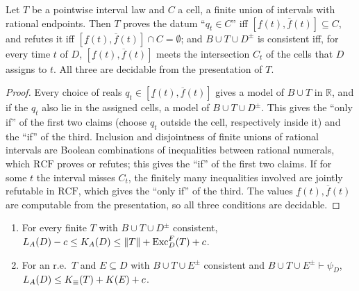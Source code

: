 \begin{lemma}[Decidability]\label{lem:laws:decidable}
Let $T$ be a pointwise interval law and $C$ a cell, a finite union of intervals with rational endpoints. Then $T$ proves the datum ``$q_t\in C$'' iff $[\underline f(t),\overline f(t)]\subseteq C$, and refutes it iff $[\underline f(t),\overline f(t)]\cap C=\emptyset$; and $B\cup T\cup D^\pm$ is consistent iff, for every time $t$ of $D$, $[\underline f(t),\overline f(t)]$ meets the intersection $C_t$ of the cells that $D$ assigns to $t$. All three are decidable from the presentation of $T$.
\end{lemma}

\begin{proof}
Every choice of reals $q_t\in[\underline f(t),\overline f(t)]$ gives a model of $B\cup T$ in $\mathbb R$, and if the $q_t$ also lie in the assigned cells, a model of $B\cup T\cup D^\pm$. This gives the ``only if'' of the first two claims (choose $q_t$ outside the cell, respectively inside it) and the ``if'' of the third. Inclusion and disjointness of finite unions of rational intervals are Boolean combinations of inequalities between rational numerals, which $\mathrm{RCF}$ proves or refutes; this gives the ``if'' of the first two claims. If for some $t$ the interval misses $C_t$, the finitely many inequalities involved are jointly refutable in $\mathrm{RCF}$, which gives the ``only if'' of the third. The values $\underline f(t),\overline f(t)$ are computable from the presentation, so all three conditions are decidable.
\end{proof}

\begin{proposition}\label{prop:laws:exceptions}
\leavevmode
\begin{enumerate}[label=(\alph*),itemsep=1pt,topsep=2pt]
\item For every finite $T$ with $B\cup T\cup D^\pm$ consistent, $L_{A}(D)-c\le K_{A}(D)\le\lVert T\rVert+\mathrm{Exc}^F_D(T)+c$.
\item For an r.e.\ $T$ and $E\subseteq D$ with $B\cup T\cup E^\pm$ consistent and $B\cup T\cup E^\pm\vdash\psi_D$, $L_{A}(D)\le K_{\equiv}(T)+K(E)+c$.
\end{enumerate}
\end{proposition}

